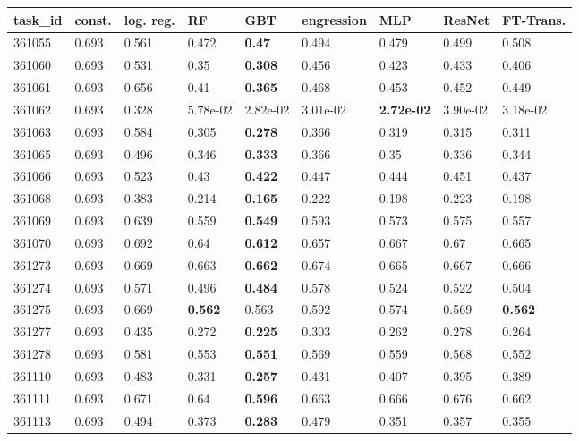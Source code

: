 \begin{table}[ht!]
\centering
\begingroup\footnotesize
\begin{tabular}{lllllllll}
  \hline
\hline
task\_id & const. & log. reg. & RF & GBT & engression & MLP & ResNet & FT-Trans. \\ 
  \hline
361055 & 0.693 & 0.561 & 0.472 & \textbf{0.47} & 0.494 & 0.479 & 0.499 & 0.508 \\ 
  361060 & 0.693 & 0.531 & 0.35 & \textbf{0.308} & 0.456 & 0.423 & 0.433 & 0.406 \\ 
  361061 & 0.693 & 0.656 & 0.41 & \textbf{0.365} & 0.468 & 0.453 & 0.452 & 0.449 \\ 
  361062 & 0.693 & 0.328 & 5.78e-02 & 2.82e-02 & 3.01e-02 & \textbf{2.72e-02} & 3.90e-02 & 3.18e-02 \\ 
  361063 & 0.693 & 0.584 & 0.305 & \textbf{0.278} & 0.366 & 0.319 & 0.315 & 0.311 \\ 
  361065 & 0.693 & 0.496 & 0.346 & \textbf{0.333} & 0.366 & 0.35 & 0.336 & 0.344 \\ 
  361066 & 0.693 & 0.523 & 0.43 & \textbf{0.422} & 0.447 & 0.444 & 0.451 & 0.437 \\ 
  361068 & 0.693 & 0.383 & 0.214 & \textbf{0.165} & 0.222 & 0.198 & 0.223 & 0.198 \\ 
  361069 & 0.693 & 0.639 & 0.559 & \textbf{0.549} & 0.593 & 0.573 & 0.575 & 0.557 \\ 
  361070 & 0.693 & 0.692 & 0.64 & \textbf{0.612} & 0.657 & 0.667 & 0.67 & 0.665 \\ 
  361273 & 0.693 & 0.669 & 0.663 & \textbf{0.662} & 0.674 & 0.665 & 0.667 & 0.666 \\ 
  361274 & 0.693 & 0.571 & 0.496 & \textbf{0.484} & 0.578 & 0.524 & 0.522 & 0.504 \\ 
  361275 & 0.693 & 0.669 & \textbf{0.562} & 0.563 & 0.592 & 0.574 & 0.569 & \textbf{0.562} \\ 
  361277 & 0.693 & 0.435 & 0.272 & \textbf{0.225} & 0.303 & 0.262 & 0.278 & 0.264 \\ 
  361278 & 0.693 & 0.581 & 0.553 & \textbf{0.551} & 0.569 & 0.559 & 0.568 & 0.552 \\ 
  361110 & 0.693 & 0.483 & 0.331 & \textbf{0.257} & 0.431 & 0.407 & 0.395 & 0.389 \\ 
  361111 & 0.693 & 0.671 & 0.64 & \textbf{0.596} & 0.663 & 0.666 & 0.676 & 0.662 \\ 
  361113 & 0.693 & 0.494 & 0.373 & \textbf{0.283} & 0.479 & 0.351 & 0.357 & 0.355 \\ 

\end{tabular}
\end{table}
